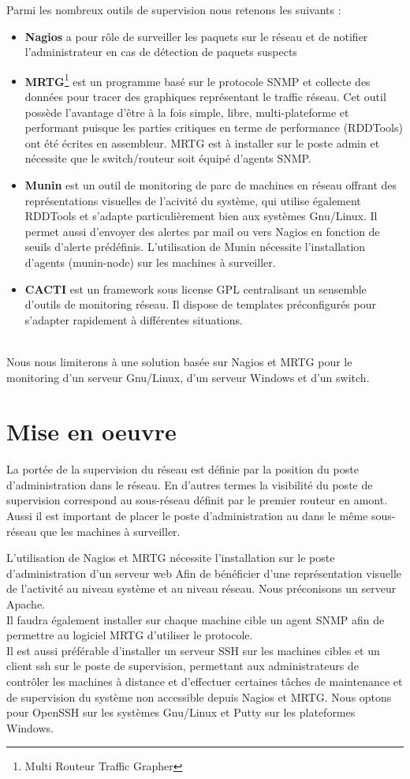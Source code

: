 \documentclass[a4paper]{article}
\begin{document}
Parmi les nombreux outils de supervision nous retenons les suivants :
\begin{itemize}
\item \textbf{Nagios} a pour rôle de surveiller les paquets sur le réseau et de notifier l'administrateur en cas de détection de paquets suspects
\item \textbf{MRTG}\footnote{Multi Routeur Traffic Grapher} est un programme basé sur le protocole SNMP et collecte des données pour tracer des graphiques représentant le traffic réseau. Cet outil possède l'avantage d'être à la fois simple, libre, multi-plateforme et performant puisque les parties critiques en terme de performance (RDDTools) ont été écrites en assembleur. MRTG est à installer sur le poste admin et nécessite que le switch/routeur soit équipé d'agents SNMP.
\item \textbf{Munin} est un outil de monitoring de parc de machines en réseau offrant des représentations visuelles de l'acivité du système, qui utilise également RDDTools et s'adapte particulièrement bien aux systèmes Gnu/Linux. Il permet aussi d'envoyer des alertes par mail ou vers Nagios en fonction de seuils d'alerte prédéfinis. L'utilisation de Munin nécessite l'installation d'agents (munin-node) sur les machines à surveiller.
\item \textbf{CACTI} est un framework sous license GPL centralisant un sensemble d'outils de monitoring réseau. Il dispose de templates préconfigurés pour s'adapter rapidement à différentes situations.
\end{itemize}
~\\
Nous nous limiterons à une solution basée sur Nagios et MRTG pour le monitoring d'un serveur Gnu/Linux, d'un serveur Windows et d'un switch. 

\section{Mise en oeuvre}
La portée de la supervision du réseau est définie par la position du poste d'administration dans le réseau. En d'autres termes la visibilité du poste de supervision correspond au sous-réseau définit par le premier routeur en amont. Aussi il est important de placer le poste d'administration au dans le même sous-réseau que les machines à surveiller.

L'utilisation de Nagios et MRTG nécessite l'installation sur le poste d'administration d'un serveur web Afin de bénéficier d'une représentation visuelle de l'activité au niveau système et au niveau réseau. Nous préconisons un serveur Apache.\\
Il faudra également installer sur chaque machine cible un agent SNMP afin de permettre au logiciel MRTG d'utiliser le protocole.\\
Il est aussi préférable d'installer un serveur SSH sur les machines cibles et un client ssh sur le poste de supervision, permettant aux administrateurs de contrôler les machines à distance et d'effectuer certaines tâches de maintenance et de supervision du système non accessible depuis Nagios et MRTG. 
Nous optons pour OpenSSH sur les systèmes Gnu/Linux et Putty sur les plateformes Windows. 
\end{document}
